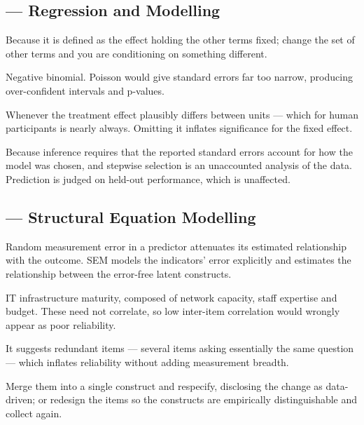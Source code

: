 \subsection*{ --- Regression and Modelling}
\begin{tightnum}
  \item Because it is defined as the effect holding the other terms fixed;
    change the set of other terms and you are conditioning on something
    different.
  \item Negative binomial. Poisson would give standard errors far too narrow,
    producing over-confident intervals and p-values.
  \item Whenever the treatment effect plausibly differs between units --- which
    for human participants is nearly always. Omitting it inflates significance
    for the fixed effect.
  \item Because inference requires that the reported standard errors account for
    how the model was chosen, and stepwise selection is an unaccounted analysis
    of the data. Prediction is judged on held-out performance, which is unaffected.
\end{tightnum}

\subsection*{ --- Structural Equation Modelling}
\begin{tightnum}
  \item Random measurement error in a predictor attenuates its estimated
    relationship with the outcome. SEM models the indicators' error explicitly
    and estimates the relationship between the error-free latent constructs.
  \item IT infrastructure maturity, composed of network capacity, staff
    expertise and budget. These need not correlate, so low inter-item
    correlation would wrongly appear as poor reliability.
  \item It suggests redundant items --- several items asking essentially the
    same question --- which inflates reliability without adding measurement
    breadth.
  \item Merge them into a single construct and respecify, disclosing the change
    as data-driven; or redesign the items so the constructs are empirically
    distinguishable and collect again.
\end{tightnum}

